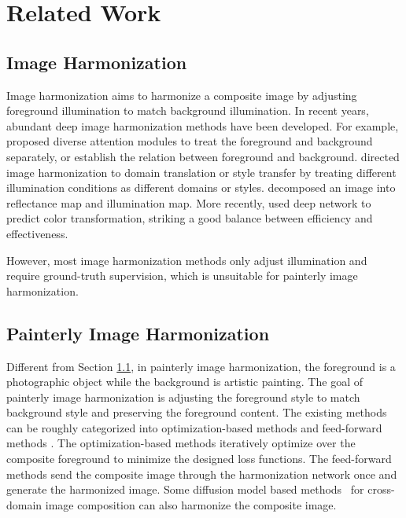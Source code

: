\documentclass[letterpaper]{article} %
\begin{document}
\section{Related Work}

\subsection{Image Harmonization} \label{sec:image_harmonization}

Image harmonization aims to harmonize a composite image by adjusting foreground illumination to match background illumination.
In recent years, abundant deep image harmonization methods \cite{tsai2017deep,Jiang_2021_ICCV,xing2022composite,peng2022frih,zhu2022image,valanarasu2022interactive,LEMaRT} have been developed. For example, \cite{xiaodong2019improving,Hao2020bmcv,sofiiuk2021foreground} proposed diverse attention modules to treat the foreground and background separately, or establish the relation between foreground and background. \cite{cong2020dovenet,cong2021bargainnet,ling2021region,hang2022scs} directed image harmonization to domain translation or style transfer by treating different illumination conditions as different domains or styles.  \cite{guo2021image,guo2021intrinsic,guo2022transformer}  decomposed an image into reflectance map and illumination map.  More recently, \cite{cong2022high,ke2022harmonizer,liang2021spatial,xue2022dccf,PCTNet,WangCVPR2023} used deep network to predict color transformation, striking a good balance between efficiency and effectiveness.

However, most image harmonization methods only adjust illumination and require ground-truth supervision, which is unsuitable for painterly image harmonization.

\subsection{Painterly Image Harmonization}

Different from Section \ref{sec:image_harmonization}, in painterly image harmonization, the foreground is a photographic object while the background is artistic painting. The goal of painterly image harmonization is adjusting the foreground style to match background style and preserving the foreground content. The existing methods \cite{luan2018deep,zhang2020deep,peng2019element} can be roughly categorized into optimization-based methods \cite{luan2018deep,zhang2020deep} and feed-forward methods \cite{peng2019element}.  The optimization-based methods \cite{luan2018deep,zhang2020deep} iteratively optimize over the composite foreground to minimize the designed loss functions. The feed-forward methods \cite{peng2019element,yan2022style,cao2022painterly} send the composite image through the harmonization network once and generate the harmonized image. %
Some diffusion model based methods~\cite{sdedit,cdc} for cross-domain image composition can also harmonize the composite image.
\end{document}

